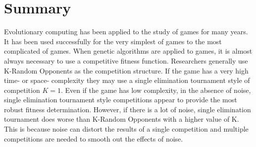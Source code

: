 \section{Summary}

Evolutionary computing has been applied to the study of games for many years. It
has been used successfully for the very simplest of games to the most
complicated of games. When genetic algorithms are applied to games, it is almost
always necessary to use a competitive fitness function. Researchers generally
use K-Random Opponents as the competition structure. If the game has a very high
time- or space- complexity they may use a single elimination tournament
style of competition \(K=1\). Even if the game has low complexity, in the
absence of noise, single elimination tournament style competitions appear to
provide the most robust fitness determination. However, if there is a lot of
noise, single elimination tournament does worse than K-Random Opponents with a
higher value of K. This is because noise can distort the results of a single
competition and multiple competitions are needed to smooth out the effects of
noise.